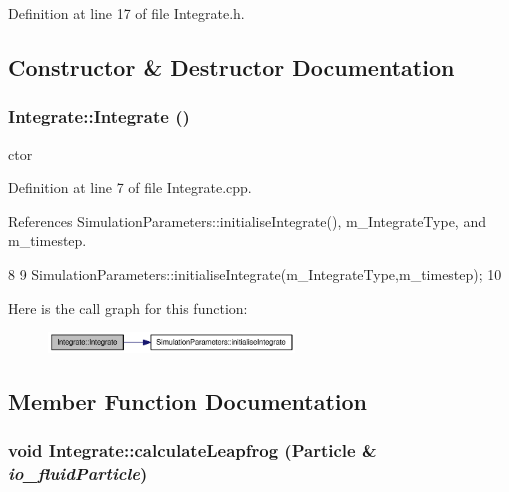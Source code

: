 Definition at line 17 of file Integrate.h.



\subsection{Constructor \& Destructor Documentation}
\hypertarget{class_integrate_af0f7265f78a87be89d07983d0d4806ee}{
\subsubsection[{Integrate}]{\setlength{\rightskip}{0pt plus 5cm}Integrate::Integrate ()}}
\label{class_integrate_af0f7265f78a87be89d07983d0d4806ee}


ctor 



Definition at line 7 of file Integrate.cpp.



References SimulationParameters::initialiseIntegrate(), m\_\-IntegrateType, and m\_\-timestep.




\begin{DoxyCode}
8 {
9     SimulationParameters::initialiseIntegrate(m_IntegrateType,m_timestep);
10 }
\end{DoxyCode}




Here is the call graph for this function:\nopagebreak
\begin{figure}[H]
\begin{center}
\leavevmode
\includegraphics[width=185pt]{class_integrate_af0f7265f78a87be89d07983d0d4806ee_cgraph}
\end{center}
\end{figure}




\subsection{Member Function Documentation}
\hypertarget{class_integrate_aec359fd96ecbce78f7fb042798402665}{
\subsubsection[{calculateLeapfrog}]{\setlength{\rightskip}{0pt plus 5cm}void Integrate::calculateLeapfrog ({\bf Particle} \& {\em io\_\-fluidParticle})}}
\label{class_integrate_aec359fd96ecbce78f7fb042798402665}


